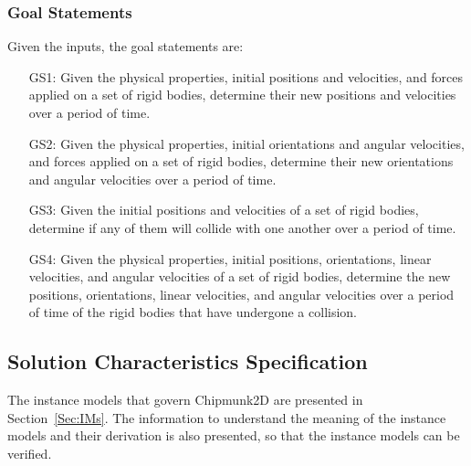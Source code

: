 \documentclass[12pt]{article}
\begin{document}
\subsubsection{Goal Statements}
\label{Sec:GoalStmt}
Given the inputs, the goal statements are:
\begin{itemize}
\item[GS1:]Given the physical properties, initial positions and velocities, and forces applied on a set of rigid bodies, determine their new positions and velocities over a period of time.
\item[GS2:]Given the physical properties, initial orientations and angular velocities, and forces applied on a set of rigid bodies, determine their new orientations and angular velocities over a period of time.
\item[GS3:]Given the initial positions and velocities of a set of rigid bodies, determine if any of them will collide with one another over a period of time.
\item[GS4:]Given the physical properties, initial positions, orientations, linear velocities, and angular velocities of a set of rigid bodies, determine the new positions, orientations, linear velocities, and angular velocities over a period of time of the rigid bodies that have undergone a collision.
\end{itemize}
\subsection{Solution Characteristics Specification}
\label{Sec:SolCharSpec}
The instance models that govern Chipmunk2D are presented in Section~\ref{Sec:IMs}. The information to understand the meaning of the instance models and their derivation is also presented, so that the instance models can be verified.
\end{document}
